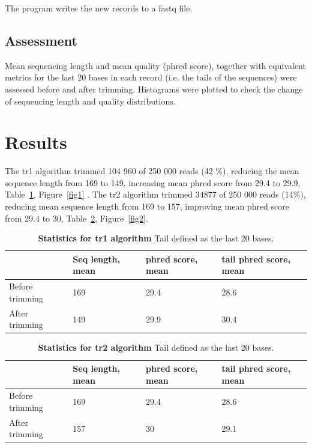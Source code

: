 \documentclass[10pt,letterpaper]{article}
\begin{document}
The program writes the new records to a fastq file.

\subsection*{Assessment}
Mean sequencing length and mean quality (phred score), together with equivalent metrics for the last 20 bases in each record (i.e. the tails of the sequences) were assessed before and after trimming. Histograms were plotted to check the change of sequencing length and quality distributions.



\section*{Results}
The tr1 algorithm trimmed 104 960 of  250 000 reads (42 \%), reducing the mean sequence length from 169 to 149, increasing mean phred score from 29.4 to 29.9, Table~\ref{table1}, Figure~\ref{fig1} . The tr2 algorithm trimmed 34877 of 250 000 reads (14\%), reducing mean sequence length from 169 to 157, improving mean phred score from 29.4 to 30, Table~\ref{table2}, Figure~\ref{fig2}.

\begin{table}[!ht]
\centering
\caption{
{\bf Statistics for tr1 algorithm} Tail defined as the last 20 bases.}

\begin{tabular}{|l|l|l|l|}
\hline
                & Seq length, mean & phred score, mean & tail phred score, mean \\ \hline
Before trimming & 169 &        29.4    &    28.6    \\ \hline
After trimming  &   149               &        29.9    &    30.4    \\ \hline
\end{tabular}
\label{table1}
\end{table}

\begin{table}[!ht]
\centering
\caption{
{\bf Statistics for tr2 algorithm} Tail defined as the last 20 bases.}

\begin{tabular}{|l|l|l|l|}
\hline
                & Seq length, mean & phred score, mean & tail phred score, mean \\ \hline
Before trimming & 169 &        29.4    & 28.6       \\ \hline
After trimming  &   157               &        30   & 29.1        \\ \hline
\end{tabular}
\label{table2}
\end{table}
\end{document}

